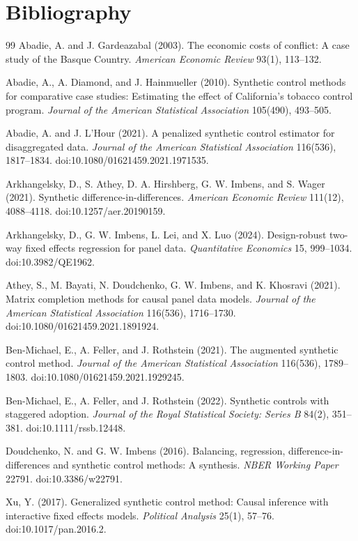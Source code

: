 \documentclass[11pt]{article}
\theoremstyle{definition}
\theoremstyle{plain}
\theoremstyle{remark}
\begin{document}
\section*{Bibliography}
\begin{thebibliography}{99}
Abadie, A. and J. Gardeazabal (2003).
The economic costs of conflict: A case study of the Basque Country.
\emph{American Economic Review} 93(1), 113--132.

Abadie, A., A. Diamond, and J. Hainmueller (2010).
Synthetic control methods for comparative case studies: Estimating the effect
of California's tobacco control program.
\emph{Journal of the American Statistical Association} 105(490), 493--505.

Abadie, A. and J. L'Hour (2021).
A penalized synthetic control estimator for disaggregated data.
\emph{Journal of the American Statistical Association} 116(536), 1817--1834.
doi:10.1080/01621459.2021.1971535.

Arkhangelsky, D., S. Athey, D. A. Hirshberg, G. W. Imbens, and S. Wager
(2021). Synthetic difference-in-differences.
\emph{American Economic Review} 111(12), 4088--4118.
doi:10.1257/aer.20190159.

Arkhangelsky, D., G. W. Imbens, L. Lei, and X. Luo (2024).
Design-robust two-way fixed effects regression for panel data.
\emph{Quantitative Economics} 15, 999--1034.
doi:10.3982/QE1962.

Athey, S., M. Bayati, N. Doudchenko, G. W. Imbens, and K. Khosravi (2021).
Matrix completion methods for causal panel data models.
\emph{Journal of the American Statistical Association} 116(536), 1716--1730.
doi:10.1080/01621459.2021.1891924.

Ben-Michael, E., A. Feller, and J. Rothstein (2021).
The augmented synthetic control method.
\emph{Journal of the American Statistical Association} 116(536), 1789--1803.
doi:10.1080/01621459.2021.1929245.

Ben-Michael, E., A. Feller, and J. Rothstein (2022).
Synthetic controls with staggered adoption.
\emph{Journal of the Royal Statistical Society: Series B} 84(2), 351--381.
doi:10.1111/rssb.12448.

Doudchenko, N. and G. W. Imbens (2016).
Balancing, regression, difference-in-differences and synthetic control methods:
A synthesis.
\emph{NBER Working Paper} 22791.
doi:10.3386/w22791.

Xu, Y. (2017).
Generalized synthetic control method: Causal inference with interactive fixed
effects models.
\emph{Political Analysis} 25(1), 57--76.
doi:10.1017/pan.2016.2.
\end{thebibliography}
\end{document}
